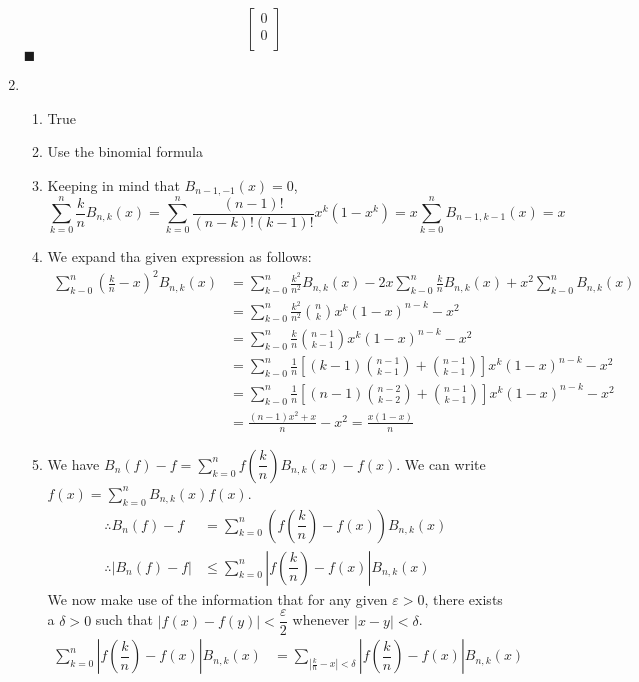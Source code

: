 \documentclass[a4paper, 11pt]{article}
\let\e\varepsilon
\begin{document}
\begin{enumerate}[label=(\arabic*), leftmargin=*]
$$\begin{bmatrix}
		0\\
		0\\
	\end{bmatrix}
	$$\hfill$\blacksquare$
	\item \begin{enumerate}
		\item True
		\item Use the binomial formula
		\item Keeping in mind that $B_{n-1,-1}(x)=0$, 
		\vspace{-2.5mm}		
		$$\displaystyle\sum_{k=0}^n \frac{k}{n}B_{n,k}(x)=\sum_{k=0}^n \frac{(n-1)!}{(n-k)!(k-1)!}x^k(1-x^k)=x\sum_{k=0}^n B_{n-1,k-1}(x)=x$$
		\item We expand tha given expression as follows: 
		\vspace{-2.5mm}		
		\begin{align*}
			\sum_{k-0}^n\left(\frac{k}{n}-x\right)^2B_{n,k}(x)&= \sum_{k-0}^n\frac{k^2}{n^2}B_{n,k}(x)-2x\sum_{k-0}^n\frac{k}{n}B_{n,k}(x)+x^2\sum_{k-0}^nB_{n,k}(x)\\
			&=\sum_{k-0}^n\frac{k^2}{n^2}{n\choose k}x^k(1-x)^{n-k}-x^2\\
			&=\sum_{k-0}^n\frac{k}{n}{n-1\choose k-1}x^k(1-x)^{n-k}-x^2\\
			&=\sum_{k-0}^n\frac{1}{n}\left[(k-1){n-1\choose k-1}+{n-1\choose k-1}\right]x^k(1-x)^{n-k}-x^2\\
			&=\sum_{k-0}^n\frac{1}{n}\left[(n-1){n-2\choose k-2}+{n-1\choose k-1}\right]x^k(1-x)^{n-k}-x^2\\
			&=\frac{(n-1)x^2+x}{n}-x^2=\frac{x(1-x)}{n}
		\end{align*}
		\item We have $\displaystyle B_n(f)-f=\sum_{k=0}^nf\left(\dfrac{k}{n}\right)B_{n,k}(x)-f(x)$. We can write $\displaystyle f(x)=\sum_{k=0}^nB_{n,k}(x)f(x)$.
		\vspace{-2.5mm}
		\begin{align*}
			\therefore B_n(f)-f&=\sum_{k=0}^n\left(f\left(\dfrac{k}{n}\right)-f(x)\right)B_{n,k}(x)\\
			\therefore |B_n(f)-f|&\leqslant \sum_{k=0}^n\left|f\left(\dfrac{k}{n}\right)-f(x)\right|B_{n,k}(x)
		\end{align*}
		\newpage
We now make use of the information that for any given $\e>0$, there exists a $\delta>0$ such that $|f(x)-f(y)|<\dfrac{\e}{2}$ whenever $|x-y|<\delta$.
\begin{align*}
	\sum_{k=0}^n\left|f\left(\dfrac{k}{n}\right)-f(x)\right|B_{n,k}(x)&=\sum_{\left|\frac{k}{n}-x\right|<\delta}\left|f\left(\dfrac{k}{n}\right)-f(x)\right|B_{n,k}(x)\\

\end{align*}
\end{enumerate}
\end{enumerate}
\end{document}
